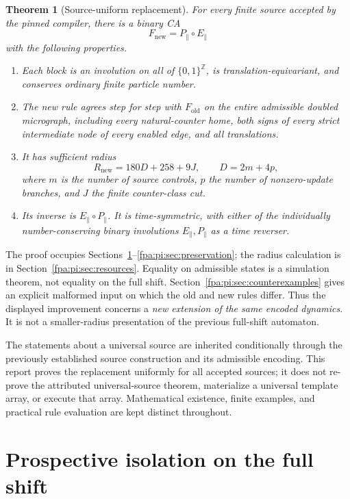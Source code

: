 \documentclass[11pt,a4paper]{article}
\numberwithin{equation}{section}
\newtheorem{theorem}{Theorem}[section]
\newcommand{\X}{\{0,1\}^{\mathbb Z}}\newcommand{\id}{\operatorname{id}}
\newcommand{\parE}{E_{\parallel}}\newcommand{\parP}{P_{\parallel}}
\newcommand{\Fnew}{F_{\mathrm{new}}}\newcommand{\Fold}{F_{\mathrm{old}}}
\begin{document}
\begin{theorem}[Source-uniform replacement]\label{fpa:pi:thm:main}
For every finite source accepted by the pinned compiler, there is a binary CA
\[
 \Fnew=\parP\circ\parE
\]
with the following properties.
\begin{enumerate}
\item Each block is an involution on \emph{all} of $\X$, is translation-equivariant, and conserves ordinary finite particle number.
\item The new rule agrees step for step with $\Fold$ on the entire admissible doubled micrograph, including every natural-counter home, both signs of every strict intermediate node of every enabled edge, and all translations.
\item It has sufficient radius
\[
 R_{\mathrm{new}}=180D+258+9J,\qquad D=2m+4p,
\]
where $m$ is the number of source controls, $p$ the number of nonzero-update branches, and $J$ the finite counter-class cut.
\item Its inverse is $\parE\circ\parP$. It is time-symmetric, with either of the individually number-conserving binary involutions $\parE,\parP$ as a time reverser.
\end{enumerate}
\end{theorem}

The proof occupies Sections~\ref{fpa:pi:sec:lemma}--\ref{fpa:pi:sec:preservation}; the radius calculation is in Section~\ref{fpa:pi:sec:resources}. Equality on admissible states is a simulation theorem, not equality on the full shift. Section~\ref{fpa:pi:sec:counterexamples} gives an explicit malformed input on which the old and new rules differ. Thus the displayed improvement concerns a \emph{new extension of the same encoded dynamics}. It is not a smaller-radius presentation of the previous full-shift automaton.

The statements about a universal source are inherited conditionally through the previously established source construction and its admissible encoding. This report proves the replacement uniformly for all accepted sources; it does not re-prove the attributed universal-source theorem, materialize a universal template array, or execute that array. Mathematical existence, finite examples, and practical rule evaluation are kept distinct throughout.

\section{Prospective isolation on the full shift}\label{fpa:pi:sec:lemma}
\end{document}
